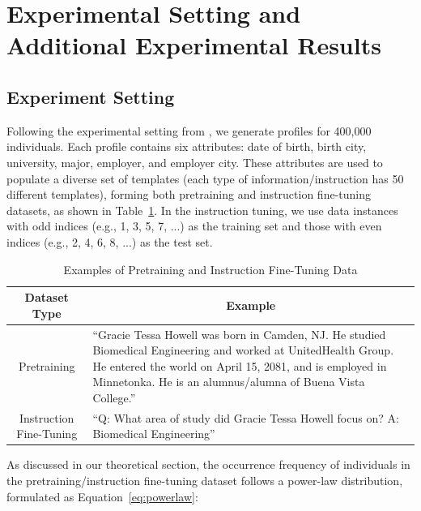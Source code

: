 \documentclass[11pt]{article}
\theoremstyle{plain}
\theoremstyle{definition}
\newcommand{\jian}[1]{{\it \color{red}{Jian: #1}}}
\begin{document}
\section{Experimental Setting and Additional Experimental Results}
\label{app:experiment}


\subsection{Experiment Setting}


Following the experimental setting from \citep{AllenZhu-icml2024-tutorial, allen2024physics}, we generate profiles for 400,000 individuals. Each profile contains six attributes: date of birth, birth city, university, major, employer, and employer city. These attributes are used to populate a diverse set of templates (each type of information/instruction has 50 different templates), forming both pretraining and instruction fine-tuning datasets, as shown in Table~\ref{tab:datasets}. In the instruction tuning, we use data instances with odd indices (e.g., 1, 3, 5, 7, ...) as the training set and those with even indices (e.g., 2, 4, 6, 8, ...) as the test set.

\begin{table}[h]
    \centering
    \caption{Examples of Pretraining and Instruction Fine-Tuning Data}
    \begin{tabular}{c p{4cm}}
        \toprule
        \textbf{Dataset Type} & \multicolumn{1}{c}{\textbf{Example}} \\
        \hline
        Pretraining & ``Gracie Tessa Howell was born in Camden, NJ. He studied Biomedical Engineering and worked at UnitedHealth Group. He entered the world on April 15, 2081, and is employed in Minnetonka. He is an alumnus/alumna of Buena Vista College.'' \\
        \hline
        Instruction Fine-Tuning & ``Q: What area of study did Gracie Tessa Howell focus on? A: Biomedical Engineering'' \\
        \bottomrule
    \end{tabular}
    
    \label{tab:datasets}
\end{table}

As discussed in our theoretical section, the occurrence frequency of individuals in the pretraining/instruction fine-tuning dataset follows a
power-law distribution, formulated as Equation~\ref{eq:powerlaw}:
\end{document}
